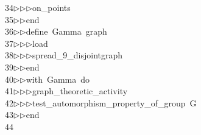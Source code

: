 \begin{tabbing}
34\>$\triangleright$\>$\triangleright$\>$\triangleright$\>on\_points\ \\[0pt]
35\>$\triangleright$\>$\triangleright$\>end\ \\[0pt]
36\>$\triangleright$\>$\triangleright$\>define\ Gamma\ graph\ \\[0pt]
37\>$\triangleright$\>$\triangleright$\>$\triangleright$\>load\ \\[0pt]
38\>$\triangleright$\>$\triangleright$\>$\triangleright$\>spread\_9\_disjointgraph\ \\[0pt]
39\>$\triangleright$\>$\triangleright$\>end\ \\[0pt]
40\>$\triangleright$\>$\triangleright$\>with\ Gamma\ do\ \\[0pt]
41\>$\triangleright$\>$\triangleright$\>$\triangleright$\>graph\_theoretic\_activity\ \\[0pt]
42\>$\triangleright$\>$\triangleright$\>$\triangleright$\>test\_automorphism\_property\_of\_group\ G\ \\[0pt]
43\>$\triangleright$\>$\triangleright$\>end\ \\[0pt]
44\>\end{tabbing}
